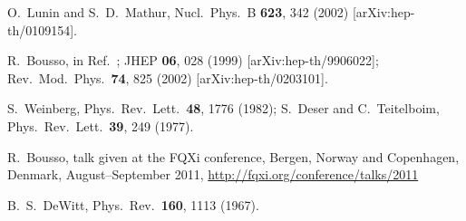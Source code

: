 \documentclass[12pt]{article}
\begin{document}
\begin{thebibliography}{99}
O.~Lunin and S.~D.~Mathur,
Nucl.\ Phys.\  B {\bf 623}, 342 (2002)
[arXiv:hep-th/0109154].

R.~Bousso,
in Ref.~\cite{'tHooft:1993gx};
JHEP {\bf 06}, 028 (1999)
[arXiv:hep-th/9906022];
Rev.\ Mod.\ Phys.\  {\bf 74}, 825 (2002)
[arXiv:hep-th/0203101].

S.~Weinberg,
Phys.\ Rev.\ Lett.\  {\bf 48}, 1776 (1982);
S.~Deser and C.~Teitelboim,
Phys.\ Rev.\ Lett.\  {\bf 39}, 249 (1977).

R.~Bousso,
talk given at the FQXi conference,
Bergen, Norway and Copenhagen, Denmark, August--September 2011,
\url{http://fqxi.org/conference/talks/2011}

B.~S.~DeWitt,
Phys.\ Rev.\  {\bf 160}, 1113 (1967).

\end{thebibliography}
\end{document}
